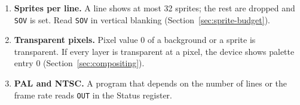 \begin{enumerate}
	\item \textbf{Sprites per line.} A line shows at most 32 sprites; the rest are dropped and \texttt{SOV} is set. Read
	      \texttt{SOV} in vertical blanking (Section~\ref{sec:sprite-budget}).
	\item \textbf{Transparent pixels.} Pixel value 0 of a background or a sprite is transparent. If every layer is transparent
	      at a pixel, the device shows palette entry 0 (Section~\ref{sec:compositing}).
	\item \textbf{PAL and NTSC.} A program that depends on the number of lines or the frame rate reads \texttt{OUT} in the
	      Status register.
\end{enumerate}

